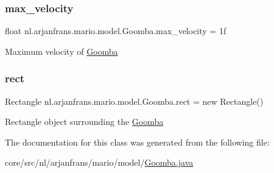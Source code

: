 \subsubsection{\texorpdfstring{max\+\_\+velocity}{max\_velocity}}
{\footnotesize\ttfamily float nl.\+arjanfrans.\+mario.\+model.\+Goomba.\+max\+\_\+velocity = 1f\hspace{0.3cm}{\ttfamily [protected]}}

Maximum velocity of \hyperlink{classnl_1_1arjanfrans_1_1mario_1_1model_1_1Goomba}{Goomba} \mbox{\label{classnl_1_1arjanfrans_1_1mario_1_1model_1_1Goomba_af4a69ae09f56588a52ee32b7228c21f6}} 
\subsubsection{\texorpdfstring{rect}{rect}}
{\footnotesize\ttfamily Rectangle nl.\+arjanfrans.\+mario.\+model.\+Goomba.\+rect = new Rectangle()\hspace{0.3cm}{\ttfamily [protected]}}

Rectangle object surrounding the \hyperlink{classnl_1_1arjanfrans_1_1mario_1_1model_1_1Goomba}{Goomba} 

The documentation for this class was generated from the following file\+:\begin{DoxyCompactItemize}
\item 
core/src/nl/arjanfrans/mario/model/\hyperlink{Goomba_8java}{Goomba.\+java}\end{DoxyCompactItemize}
